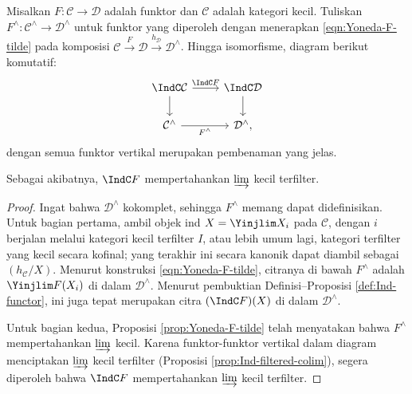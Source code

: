 \begin{lemma}\label{prop:IndF-vs-Yoneda}
	Misalkan $F: \mathcal{C} \to \mathcal{D}$ adalah funktor dan $\mathcal{C}$ adalah kategori kecil. Tuliskan $F^\wedge: \mathcal{C}^\wedge \to \mathcal{D}^\wedge$ untuk funktor yang diperoleh dengan menerapkan \eqref{eqn:Yoneda-F-tilde} pada komposisi $\mathcal{C} \xrightarrow{F} \mathcal{D} \xrightarrow{h_{\mathcal{D}}} \mathcal{D}^\wedge$. Hingga isomorfisme, diagram berikut komutatif:
	\[\begin{tikzcd}
		\IndC\mathcal{C} \arrow[r, "{\IndC F}"] \arrow[d] & \IndC\mathcal{D} \arrow[d] \\
		\mathcal{C}^\wedge \arrow[r, "{F^\wedge}"'] & \mathcal{D}^\wedge ,
	\end{tikzcd}\]
	dengan semua funktor vertikal merupakan pembenaman yang jelas.
	
	Sebagai akibatnya, $\IndC F$ mempertahankan $\varinjlim$ kecil terfilter.
\end{lemma}
\begin{proof}
	Ingat bahwa $\mathcal{D}^\wedge$ kokomplet, sehingga $F^\wedge$ memang dapat didefinisikan. Untuk bagian pertama, ambil objek ind $X = \Yinjlim X_i$ pada $\mathcal{C}$, dengan $i$ berjalan melalui kategori kecil terfilter $I$, atau lebih umum lagi, kategori terfilter yang kecil secara kofinal; yang terakhir ini secara kanonik dapat diambil sebagai $(h_{\mathcal{C}}/X)$. Menurut konstruksi \eqref{eqn:Yoneda-F-tilde}, citranya di bawah $F^\wedge$ adalah $\Yinjlim F(X_i)$ di dalam $\mathcal{D}^\wedge$. Menurut pembuktian Definisi--Proposisi \ref{def:Ind-functor}, ini juga tepat merupakan citra $(\IndC F)(X)$ di dalam $\mathcal{D}^\wedge$.
	
	Untuk bagian kedua, Proposisi \ref{prop:Yoneda-F-tilde} telah menyatakan bahwa $F^\wedge$ mempertahankan $\varinjlim$ kecil. Karena funktor-funktor vertikal dalam diagram menciptakan $\varinjlim$ kecil terfilter (Proposisi \ref{prop:Ind-filtered-colim}), segera diperoleh bahwa $\IndC F$ mempertahankan $\varinjlim$ kecil terfilter.
\end{proof}


